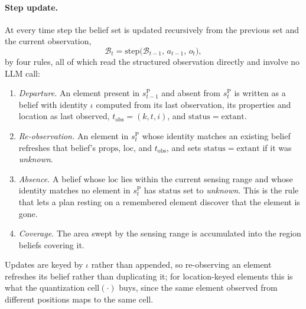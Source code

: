 \documentclass[11pt]{article}
\newcommand{\calB}{\mathcal{B}}
\newcommand{\sP}{s^{\mathrm{P}}}
\newcommand{\loc}{\mathrm{loc}}
\newcommand{\stat}{\mathrm{status}}
\newcommand{\props}{\mathrm{props}}
\newcommand{\cell}{\mathrm{cell}}
\newcommand{\tobs}{t_{\mathrm{obs}}}
\begin{document}
\paragraph{Step update.}
At every time step the belief set is updated recursively from the previous set and the current observation,
\begin{equation}
\calB_t=\mathrm{step}\big(\calB_{t-1},\,a_{t-1},\,o_t\big),
\label{eq:step}
\end{equation}
by four rules, all of which read the structured observation directly and involve no LLM call:
\begin{enumerate}[leftmargin=1.5em,itemsep=1pt]
\item \emph{Departure.} An element present in $\sP_{t-1}$ and absent from $\sP_t$ is written as a belief with identity $\iota$ computed from its last observation, its properties and location as last observed, $\tobs=(k,t,i)$, and $\stat=\mathrm{extant}$.
\item \emph{Re-observation.} An element in $\sP_t$ whose identity matches an existing belief refreshes that belief's $\props$, $\loc$, and $\tobs$, and sets $\stat=\mathrm{extant}$ if it was \emph{unknown}.
\item \emph{Absence.} A belief whose $\loc$ lies within the current sensing range and whose identity matches no element in $\sP_t$ has $\stat$ set to \emph{unknown}. This is the rule that lets a plan resting on a remembered element discover that the element is gone.
\item \emph{Coverage.} The area swept by the sensing range is accumulated into the region beliefs covering it.
\end{enumerate}
Updates are keyed by $\iota$ rather than appended, so re-observing an element refreshes its belief rather than duplicating it; for location-keyed elements this is what the quantization $\cell(\cdot)$ buys, since the same element observed from different positions maps to the same cell.
\end{document}
